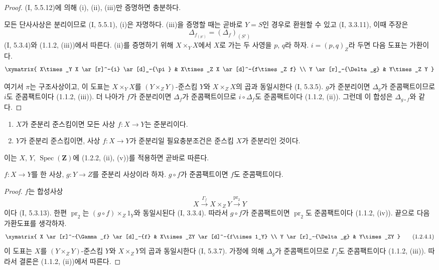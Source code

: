 \begin{proof}
(I, 5.5.12)에 의해 (i), (ii), (iii)만 증명하면 충분하다.

모든 단사사상은 분리이므로 (I, 5.5.1), (i)은 자명하다. (iii)을
증명할 때는 곧바로 $Y=S$인 경우로 환원할 수 있고 (I, 3.3.11),
이때 주장은
\[
  \Delta_{f_{(S')}}=(\Delta_f)_{(S')}
\]
(I, 5.3.4)와 (1.1.2, (iii))에서 따른다. (ii)를 증명하기 위해
$X\times_YX$에서 $X$로 가는 두 사영을 $p$, $q$라 하자.
$i=(p,q)_Z$라 두면 다음 도표는 가환이다.
\[
\xymatrix{
  X\times_Y X \ar[r]^-{i} \ar[d]_-{\pi} & X\times_Z X
    \ar[d]^-{f\times_Z f} \\
  Y \ar[r]_-{\Delta_g} & Y\times_Z Y
}
\]


여기서 $\pi$는 구조사상이고, 이 도표는 $X\times_YX$를
$(Y\times_ZY)$-준스킴 $Y$와 $X\times_ZX$의 곱과 동일시한다
(I, 5.3.5). $g$가 준분리이면 $\Delta_g$가 준콤팩트이므로
$i$도 준콤팩트이다 (1.1.2, (iii)). 더 나아가 $f$가 준분리이면
$\Delta_f$가 준콤팩트이므로 $i\circ\Delta_f$도 준콤팩트이다
(1.1.2, (ii)). 그런데 이 합성은 $\Delta_{g\circ f}$와 같다.
\end{proof}

\begin{corollary}[1.2.3]
\label{IV.1.2.3-fr}
\begin{enumerate}
  \item[(i)] $X$가 준분리 준스킴이면 모든 사상 $f:X\to Y$는
  준분리이다.
  \item[(ii)] $Y$가 준분리 준스킴이면, 사상 $f:X\to Y$가
  준분리일 필요충분조건은 준스킴 $X$가 준분리인 것이다.
\end{enumerate}
\end{corollary}

이는 $X$, $Y$, $\operatorname{Spec}(\mathbf Z)$에 (1.2.2, (ii),
(v))를 적용하면 곧바로 따른다.

\begin{proposition}[1.2.4]
\label{IV.1.2.4-fr}
$f:X\to Y$를 한 사상, $g:Y\to Z$를 준분리 사상이라 하자.
$g\circ f$가 준콤팩트이면 $f$도 준콤팩트이다.
\end{proposition}

\begin{proof}
$f$는 합성사상
\[
  X\xrightarrow{\Gamma_f}X\times_ZY
  \xrightarrow{\operatorname{pr}_2}Y
\]
이다 (I, 5.3.13). 한편 $\operatorname{pr}_2$는
$(g\circ f)\times_Z1_Y$와 동일시된다 (I, 3.3.4). 따라서
$g\circ f$가 준콤팩트이면 $\operatorname{pr}_2$도 준콤팩트이다
(1.1.2, (iv)). 끝으로 다음 가환도표를 생각하자.
\[
\xymatrix{
  X \ar[r]^-{\Gamma_f} \ar[d]_-{f} & X\times_ZY
    \ar[d]^-{f\times 1_Y} \\
  Y \ar[r]_-{\Delta_g} & Y\times_ZY
}
\tag{1.2.4.1}
\label{IV.1.2.4.1-fr}
\]
이 도표는 $X$를 $(Y\times_ZY)$-준스킴 $Y$와 $X\times_ZY$의 곱과
동일시한다 (I, 5.3.7). 가정에 의해 $\Delta_g$가 준콤팩트이므로
$\Gamma_f$도 준콤팩트이다 (1.1.2, (iii)). 따라서 결론은
(1.1.2, (ii))에서 따른다.
\end{proof}

